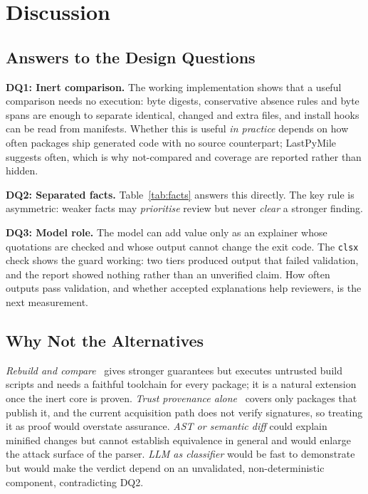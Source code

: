 \documentclass[conference]{IEEEtran}
\newcommand{\code}[1]{\texttt{#1}}
\begin{document}
\section{Discussion}\label{sec:disc}

\subsection{Answers to the Design Questions}
\textbf{DQ1: Inert comparison.} The working implementation shows that a
useful comparison needs no execution: byte digests, conservative absence rules and
byte spans are enough to separate identical, changed and extra files, and
install hooks can be read from manifests. Whether this is useful \emph{in
practice} depends on how often packages ship generated code with no source
counterpart; LastPyMile~\cite{vu2021} suggests often, which is why
\textsf{not-compared} and coverage are reported rather than hidden.

\textbf{DQ2: Separated facts.} Table~\ref{tab:facts} answers this directly.
The key rule is asymmetric: weaker facts may \emph{prioritise} review but never
\emph{clear} a stronger finding.

\textbf{DQ3: Model role.} The model can add value only as an explainer whose
quotations are checked and whose output cannot change the exit code. The
\code{clsx} check shows the guard working: two tiers produced output that failed
validation, and the report showed nothing rather than an unverified claim. How
often outputs pass validation, and whether accepted explanations help reviewers,
is the next measurement.

\subsection{Why Not the Alternatives}
\emph{Rebuild and compare}~\cite{lamb2021} gives stronger guarantees but
executes untrusted build scripts and needs a faithful toolchain for every
package; it is a natural extension once the inert core is proven.
\emph{Trust provenance alone}~\cite{npmprov} covers only packages that publish
it, and the current acquisition path does not verify signatures, so treating it
as proof would overstate assurance. \emph{AST or semantic diff} could explain
minified changes but cannot establish equivalence in general and would enlarge
the attack surface of the parser. \emph{LLM as classifier} would be fast to
demonstrate but would make the verdict depend on an unvalidated, non-deterministic
component, contradicting DQ2.
\end{document}
